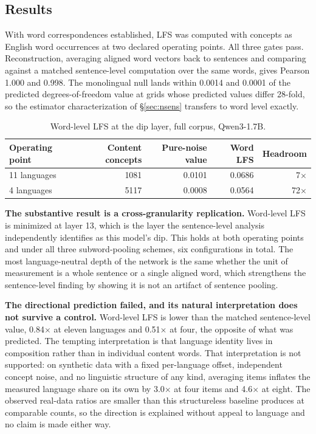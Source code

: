 \documentclass[11pt,a4paper]{article}
\begin{document}
\subsection{Results}
With word correspondences established, LFS was computed with concepts as
English word occurrences at two declared operating points. All three gates
pass. Reconstruction, averaging aligned word vectors back to sentences and
comparing against a matched sentence-level computation over the same words,
gives Pearson 1.000 and 0.998. The monolingual null lands within 0.0014 and
0.0001 of the predicted degrees-of-freedom value at grids whose predicted
values differ 28-fold, so the estimator characterization of
\S\ref{sec:nsens} transfers to word level exactly.

\begin{table}[H]
\centering
\small
\caption{Word-level LFS at the dip layer, full corpus, Qwen3-1.7B.}
\begin{tabular}{lrrrr}
\toprule
Operating point & Content concepts & Pure-noise value & Word LFS & Headroom \\
\midrule
11 languages & 1081 & 0.0101 & 0.0686 & 7$\times$ \\
4 languages & 5117 & 0.0008 & 0.0564 & 72$\times$ \\
\bottomrule
\end{tabular}
\end{table}

\textbf{The substantive result is a cross-granularity replication.}
Word-level LFS is minimized at layer 13, which is the layer the
sentence-level analysis independently identifies as this model's dip. This
holds at both operating points and under all three subword-pooling schemes,
six configurations in total. The most language-neutral depth of the network
is the same whether the unit of measurement is a whole sentence or a single
aligned word, which strengthens the sentence-level finding by showing it is
not an artifact of sentence pooling.

\textbf{The directional prediction failed, and its natural interpretation
does not survive a control.} Word-level LFS is lower than the matched
sentence-level value, 0.84$\times$ at eleven languages and 0.51$\times$ at
four, the opposite of what was predicted. The tempting interpretation is that
language identity lives in composition rather than in individual content
words. That interpretation is not supported: on synthetic data with a fixed
per-language offset, independent concept noise, and no linguistic structure
of any kind, averaging items inflates the measured language share on its own
by 3.0$\times$ at four items and 4.6$\times$ at eight. The observed
real-data ratios are smaller than this structureless baseline produces at
comparable counts, so the direction is explained without appeal to language
and no claim is made either way.
\end{document}
